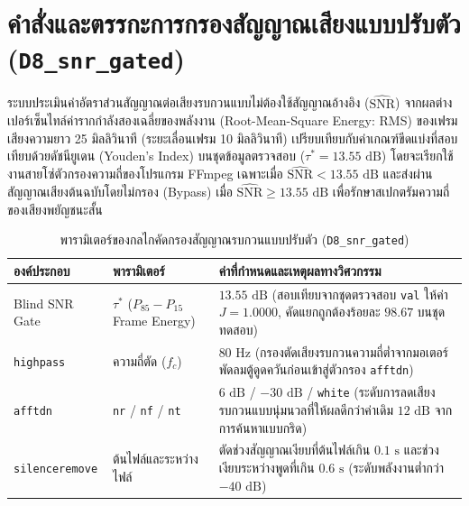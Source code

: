 \providecommand{\todo}[1]{\textbf{[TODO: #1]}}
\setcounter{chapter}{-1}

\section*{คำสั่งและตรรกะการกรองสัญญาณเสียงแบบปรับตัว (\texttt{D8\_snr\_gated})}

ระบบประเมินค่าอัตราส่วนสัญญาณต่อเสียงรบกวนแบบไม่ต้องใช้สัญญาณอ้างอิง ($\widehat{\mathrm{SNR}}$) จากผลต่างเปอร์เซ็นไทล์ค่ารากกำลังสองเฉลี่ยของพลังงาน (Root-Mean-Square Energy: RMS) ของเฟรมเสียงความยาว 25 มิลลิวินาที (ระยะเลื่อนเฟรม 10 มิลลิวินาที) เปรียบเทียบกับค่าเกณฑ์ขีดแบ่งที่สอบเทียบด้วยดัชนียูเดน (Youden's Index) บนชุดข้อมูลตรวจสอบ ($\tau^* = 13.55\text{ dB}$) โดยจะเรียกใช้งานสายโซ่ตัวกรองความถี่ของโปรแกรม FFmpeg เฉพาะเมื่อ $\widehat{\mathrm{SNR}} < 13.55\text{ dB}$ และส่งผ่านสัญญาณเสียงต้นฉบับโดยไม่กรอง (Bypass) เมื่อ $\widehat{\mathrm{SNR}} \ge 13.55\text{ dB}$ เพื่อรักษาสเปกตรัมความถี่ของเสียงพยัญชนะสั้น

\begin{table}[H]
\centering
\caption{พารามิเตอร์ของกลไกคัดกรองสัญญาณรบกวนแบบปรับตัว (\texttt{D8\_snr\_gated})}
\label{tab:appfilter}
\small
\begin{tabular}{|l|l|p{6.5cm}|}
\hline
\textbf{องค์ประกอบ} & \textbf{พารามิเตอร์} & \textbf{ค่าที่กำหนดและเหตุผลทางวิศวกรรม} \\
\hline
Blind SNR Gate & $\tau^*$ ($P_{85} - P_{15}$ Frame Energy) & $13.55\text{ dB}$ (สอบเทียบจากชุดตรวจสอบ \texttt{val} ให้ค่า $J = 1.0000$, คัดแยกถูกต้องร้อยละ $98.67$ บนชุดทดสอบ) \\
\hline
\texttt{highpass} & ความถี่ตัด ($f_c$) & $80\text{ Hz}$ (กรองตัดเสียงรบกวนความถี่ต่ำจากมอเตอร์พัดลมตู้ดูดควันก่อนเข้าสู่ตัวกรอง \texttt{afftdn}) \\
\hline
\texttt{afftdn} & \texttt{nr} / \texttt{nf} / \texttt{nt} & $6\text{ dB}$ / $-30\text{ dB}$ / \texttt{white} (ระดับการลดเสียงรบกวนแบบนุ่มนวลที่ให้ผลดีกว่าค่าเดิม $12\text{ dB}$ จากการค้นหาแบบกริด) \\
\hline
\texttt{silenceremove} & ต้นไฟล์และระหว่างไฟล์ & ตัดช่วงสัญญาณเงียบที่ต้นไฟล์เกิน $0.1\text{ s}$ และช่วงเงียบระหว่างพูดที่เกิน $0.6\text{ s}$ (ระดับพลังงานต่ำกว่า $-40\text{ dB}$) \\
\hline
\end{tabular}
\end{table}

